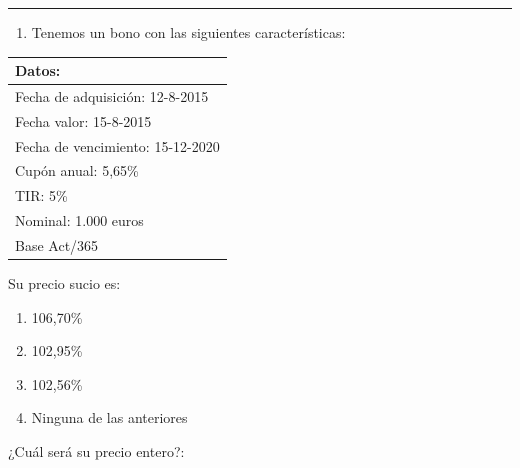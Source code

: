 \documentclass[
  letterpaper,
  DIV=11,
  numbers=noendperiod]{scrreprt}
\providecommand{\tightlist}{%
  \setlength{\itemsep}{0pt}\setlength{\parskip}{0pt}}\usepackage{longtable,booktabs,array}
\begin{document}
\begin{center}\rule{0.5\linewidth}{0.5pt}\end{center}

\begin{enumerate}
\def\labelenumi{\arabic{enumi}.}
\setcounter{enumi}{109}
\tightlist
\item
  Tenemos un bono con las siguientes características:
\end{enumerate}

\begin{longtable}[]{@{}l@{}}
\toprule()
\textbf{Datos:} \\
\midrule()
\endhead
Fecha de adquisición: 12-8-2015 \\
Fecha valor: 15-8-2015 \\
Fecha de vencimiento: 15-12-2020 \\
Cupón anual: 5,65\% \\
TIR: 5\% \\
Nominal: 1.000 euros \\
Base Act/365 \\
\bottomrule()
\end{longtable}

Su precio sucio es:

\begin{enumerate}
\def\labelenumi{\alph{enumi}.}
\item
  106,70\%
\item
  102,95\%
\item
  102,56\%
\item
  Ninguna de las anteriores
\end{enumerate}

¿Cuál será su precio entero?:
\end{document}
